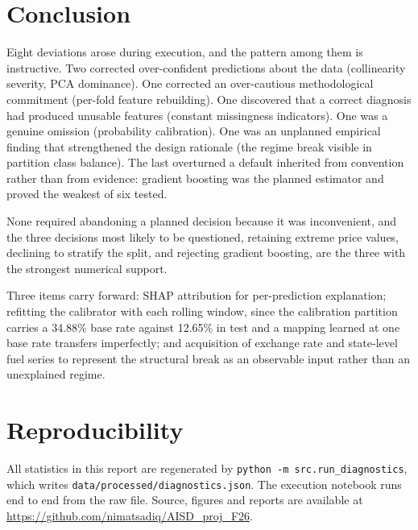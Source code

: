 \documentclass[conference]{IEEEtran}
\begin{document}
\section{Conclusion}

Eight deviations arose during execution, and the pattern among them is
instructive. Two corrected over-confident predictions about the data
(collinearity severity, PCA dominance). One corrected an over-cautious
methodological commitment (per-fold feature rebuilding). One discovered that a
correct diagnosis had produced unusable features (constant missingness
indicators). One was a genuine omission (probability calibration). One was an
unplanned empirical finding that strengthened the design rationale (the
regime break visible in partition class balance). The last overturned a
default inherited from convention rather than from evidence: gradient boosting
was the planned estimator and proved the weakest of six tested.

None required abandoning a planned decision because it was inconvenient, and
the three decisions most likely to be questioned, retaining extreme price
values, declining to stratify the split, and rejecting gradient boosting, are
the three with the strongest numerical support.

Three items carry forward: SHAP attribution for per-prediction explanation;
refitting the calibrator with each rolling window, since the calibration
partition carries a 34.88\% base rate against 12.65\% in test and a mapping
learned at one base rate transfers imperfectly; and acquisition of exchange
rate and state-level fuel series to represent the structural break as an
observable input rather than an unexplained regime.

\section*{Reproducibility}

All statistics in this report are regenerated by
\texttt{python -m src.run\_diagnostics}, which writes
\texttt{data/processed/diagnostics.json}. The execution notebook runs end to
end from the raw file. Source, figures and reports are available at
\url{https://github.com/nimatsadiq/AISD_proj_F26}.
\end{document}
